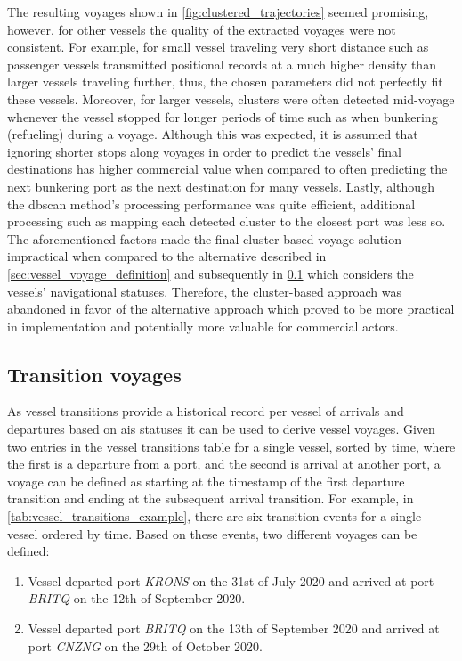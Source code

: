 The resulting voyages shown in \cref{fig:clustered_trajectories} seemed promising, however, for other vessels the quality of the extracted voyages were not consistent. For example, for small vessel traveling very short distance such as passenger vessels transmitted positional records at a much higher density than larger vessels traveling further, thus, the chosen parameters did not perfectly fit these vessels. Moreover, for larger vessels, clusters were often detected mid-voyage whenever the vessel stopped for longer periods of time such as when bunkering (refueling) during a voyage. Although this was expected, it is assumed that ignoring shorter stops along voyages in order to predict the vessels' final destinations has higher commercial value when compared to often predicting the next bunkering port as the next destination for many vessels. Lastly, although the \acrshort{dbscan} method's processing performance was quite efficient, additional processing such as mapping each detected cluster to the closest port was less so. The aforementioned factors made the final cluster-based voyage solution impractical when compared to the alternative described in \cref{sec:vessel_voyage_definition} and subsequently in \cref{sec:transition_voyages} which considers the vessels' navigational statuses. Therefore, the cluster-based approach was abandoned in favor of the alternative approach which proved to be more practical in implementation and potentially more valuable for commercial actors.

\subsection{Transition voyages}
\label{sec:transition_voyages}

As vessel transitions provide a historical record per vessel of arrivals and departures based on \acrshort{ais} statuses it can be used to derive vessel voyages. Given two entries in the vessel transitions table for a single vessel, sorted by time, where the first is a departure from a port, and the second is arrival at another port, a voyage can be defined as starting at the timestamp of the first departure transition and ending at the subsequent arrival transition. For example, in \cref{tab:vessel_transitions_example}, there are six transition events for a single vessel ordered by time. Based on these events, two different voyages can be defined:

\begin{enumerate}
    \item  Vessel departed port \textit{KRONS} on the 31st of July 2020 and arrived at port \textit{BRITQ} on the 12th of September 2020.
    \item  Vessel departed port \textit{BRITQ} on the 13th of September 2020 and arrived at port \textit{CNZNG} on the 29th of October 2020.
\end{enumerate}

